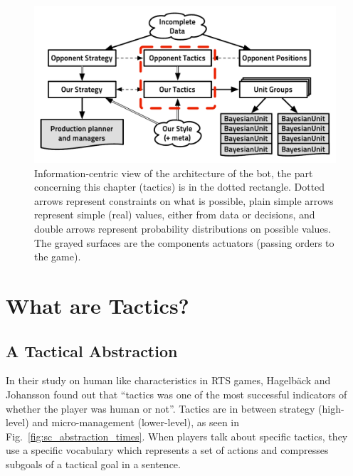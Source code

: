 \begin{figure}[!ht]
\begin{center}
\includegraphics[width=0.84\columnwidth]{images/starcraft_bbq_concept_TACTICS.pdf}
\end{center}
\label{fig:conceptTACTICS}
\caption{Information-centric view of the architecture of the bot, the part concerning this chapter (tactics) is in the dotted rectangle. Dotted arrows represent constraints on what is possible, plain simple arrows represent simple (real) values, either from data or decisions, and double arrows represent probability distributions on possible values. The grayed surfaces are the components actuators (passing orders to the game).}
\end{figure}

\section{What are Tactics?}
\subsection{A Tactical Abstraction}
In their study on human like characteristics in RTS games, Hagelb\"{a}ck and Johansson \cite{HagelbackCIG10} found out that ``tactics was one of the most successful indicators of whether the player was human or not''. Tactics are in between strategy (high-level) and micro-management (lower-level), as seen in Fig.~\ref{fig:sc_abstraction_times}. When players talk about specific tactics, they use a specific vocabulary which represents a set of actions and compresses subgoals of a tactical goal in a sentence. %

